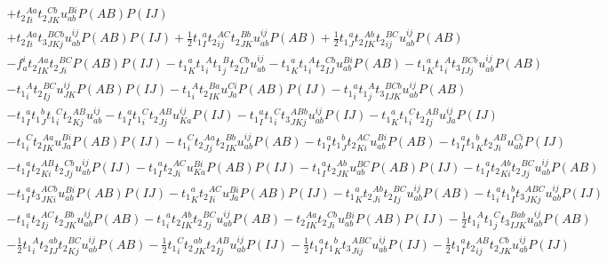 \begin{gather*}
+ {t_2}^{Aa}_{Ii} {t_2}^{Cb}_{JK} u^{Bi}_{ab} P(AB) P(IJ) \\
+ {t_2}^{Aa}_{Ii} {t_3}^{BCb}_{JKj} u^{ij}_{ab} P(AB) P(IJ)
+ \frac{1}{2}{t_1}^{a}_{I} {t_2}^{AC}_{ij} {t_2}^{Bb}_{JK} u^{ij}_{ab} P(AB)
+ \frac{1}{2}{t_1}^{a}_{J} {t_2}^{Ab}_{IK} {t_2}^{BC}_{ij} u^{ij}_{ab} P(AB) \\
- f^{i}_{a} {t_2}^{Aa}_{IK} {t_2}^{BC}_{Ji} P(AB) P(IJ)
- {t_1}^{a}_{K} {t_1}^{A}_{i} {t_1}^{B}_{j} {t_2}^{Cb}_{IJ} u^{ij}_{ab}
- {t_1}^{a}_{K} {t_1}^{A}_{i} {t_2}^{Cb}_{IJ} u^{Bi}_{ab} P(AB)
- {t_1}^{a}_{K} {t_1}^{A}_{i} {t_3}^{BCb}_{IJj} u^{ij}_{ab} P(AB) \\
- {t_1}^{A}_{i} {t_2}^{BC}_{Ij} u^{ij}_{JK} P(AB) P(IJ)
- {t_1}^{A}_{i} {t_2}^{Ba}_{IK} u^{Ci}_{Ja} P(AB) P(IJ)
- {t_1}^{a}_{i} {t_1}^{A}_{j} {t_3}^{BCb}_{IJK} u^{ij}_{ab} P(AB) \\
- {t_1}^{a}_{I} {t_1}^{b}_{J} {t_1}^{C}_{i} {t_2}^{AB}_{Kj} u^{ij}_{ab}
- {t_1}^{a}_{I} {t_1}^{C}_{i} {t_2}^{AB}_{Jj} u^{ij}_{Ka} P(IJ)
- {t_1}^{a}_{I} {t_1}^{C}_{i} {t_3}^{ABb}_{JKj} u^{ij}_{ab} P(IJ)
- {t_1}^{a}_{K} {t_1}^{C}_{i} {t_2}^{AB}_{Ij} u^{ij}_{Ja} P(IJ) \\
- {t_1}^{C}_{i} {t_2}^{Aa}_{IK} u^{Bi}_{Ja} P(AB) P(IJ)
- {t_1}^{C}_{i} {t_2}^{Aa}_{Jj} {t_2}^{Bb}_{IK} u^{ij}_{ab} P(AB)
- {t_1}^{a}_{I} {t_1}^{b}_{J} {t_2}^{AC}_{Ki} u^{Bi}_{ab} P(AB)
- {t_1}^{a}_{I} {t_1}^{b}_{K} {t_2}^{AB}_{Ji} u^{Ci}_{ab} P(IJ) \\
- {t_1}^{a}_{I} {t_2}^{AB}_{Ki} {t_2}^{Cb}_{Jj} u^{ij}_{ab} P(IJ)
- {t_1}^{a}_{I} {t_2}^{AC}_{Ji} u^{Bi}_{Ka} P(AB) P(IJ)
- {t_1}^{a}_{I} {t_2}^{Ab}_{JK} u^{BC}_{ab} P(AB) P(IJ)
- {t_1}^{a}_{I} {t_2}^{Ab}_{Ki} {t_2}^{BC}_{Jj} u^{ij}_{ab} P(AB) \\
- {t_1}^{a}_{I} {t_3}^{ACb}_{JKi} u^{Bi}_{ab} P(AB) P(IJ)
- {t_1}^{a}_{K} {t_2}^{AC}_{Ii} u^{Bi}_{Ja} P(AB) P(IJ)
- {t_1}^{a}_{K} {t_2}^{Ab}_{Ji} {t_2}^{BC}_{Ij} u^{ij}_{ab} P(AB)
- {t_1}^{a}_{i} {t_1}^{b}_{I} {t_3}^{ABC}_{JKj} u^{ij}_{ab} P(IJ) \\
- {t_1}^{a}_{i} {t_2}^{AC}_{Ij} {t_2}^{Bb}_{JK} u^{ij}_{ab} P(AB)
- {t_1}^{a}_{i} {t_2}^{Ab}_{IK} {t_2}^{BC}_{Jj} u^{ij}_{ab} P(AB)
- {t_2}^{Aa}_{IK} {t_2}^{Cb}_{Ji} u^{Bi}_{ab} P(AB) P(IJ)
- \frac{1}{2}{t_1}^{A}_{i} {t_1}^{C}_{j} {t_3}^{Bab}_{IJK} u^{ij}_{ab} P(AB) \\
- \frac{1}{2}{t_1}^{A}_{i} {t_2}^{ab}_{IJ} {t_2}^{BC}_{Kj} u^{ij}_{ab} P(AB)
- \frac{1}{2}{t_1}^{C}_{i} {t_2}^{ab}_{JK} {t_2}^{AB}_{Ij} u^{ij}_{ab} P(IJ)
- \frac{1}{2}{t_1}^{a}_{I} {t_1}^{b}_{K} {t_3}^{ABC}_{Jij} u^{ij}_{ab} P(IJ)
- \frac{1}{2}{t_1}^{a}_{I} {t_2}^{AB}_{ij} {t_2}^{Cb}_{JK} u^{ij}_{ab} P(IJ) \\

\end{gather*}
